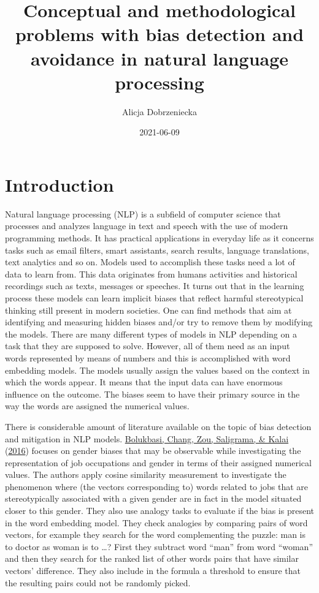 \documentclass[
  12pt,
]{book}
\title{Conceptual and methodological problems with bias detection and avoidance in natural language processing}
\author{Alicja Dobrzeniecka}
\date{2021-06-09}
\begin{document}
\maketitle

{
\setcounter{tocdepth}{5}
\tableofcontents
}
\hypertarget{introduction}{%
\chapter{Introduction}\label{introduction}}

Natural language processing (NLP) is a subfield of computer science that processes and analyzes language in text and speech
with the use of modern programming methods. It has practical applications in everyday life as it concerns tasks such as email filters,
smart assistants, search results, language translations, text analytics and so on. Models used to accomplish these tasks need a lot of
data to learn from. This data originates from humans activities and historical recordings such as texts, messages or speeches. It turns out
that in the learning process these models can learn implicit biases that reflect harmful stereotypical thinking still present in modern societies. One can find methods that aim at identifying and measuring hidden biases and/or try to remove them by modifying the models.
There are many different types of models in NLP depending on a task that they are supposed to solve. However, all of them need as an input words represented by means of numbers and this is accomplished with word embedding models. The models usually assign the values based on the context in which the words appear. It means that the input data can have enormous influence on the outcome. The biases seem to have their primary source in the way the words are assigned the numerical values.

There is considerable amount of literature available on the topic of bias detection and mitigation in NLP models. \protect\hyperlink{ref-Bolukbasi2016Man}{Bolukbasi, Chang, Zou, Saligrama, \& Kalai} (\protect\hyperlink{ref-Bolukbasi2016Man}{2016}) focuses on gender biases that may be observable while investigating the representation of job occupations and gender in terms of their assigned numerical
values. The authors apply cosine similarity measurement to investigate the phenomenon where (the vectors corresponding to) words related to jobs that are stereotypically associated with a given gender are in fact in the model situated closer to this gender.
They also use analogy tasks to evaluate if the bias is present in the word embedding model. They check analogies by comparing pairs of word vectors, for example they search for the word complementing the puzzle: man is to doctor as woman is to \ldots? First they subtract word ``man'' from word ``woman'' and then
they search for the ranked list of other words pairs that have similar vectors' difference. They also include in the formula a threshold to ensure that the resulting pairs could not be randomly picked.
\end{document}
